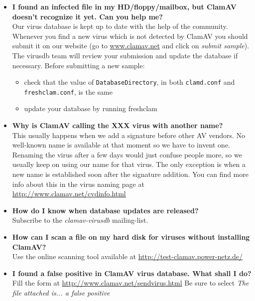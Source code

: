 \documentclass[a4paper,titlepage,12pt]{article}
\begin{document}
\begin{itemize}
	\item \textbf{I found an infected file in my HD/floppy/mailbox, but
	ClamAV doesn't recognize it yet. Can you help me?}\\
	Our virus database is kept up to date with the help of the community.
	Whenever you find a new virus which is not detected by ClamAV you
	should submit it on our website (go to \url{www.clamav.net} and
	click on \emph{submit sample}). The virusdb team will review your
	submission and update the database if necessary. Before submitting
	a new sample:
	\begin{itemize}
	    \item check that the value of \verb+DatabaseDirectory+, in both
	    \verb+clamd.conf+ and\\ \verb+freshclam.conf+, is the same
	    \item update your database by running freshclam
	\end{itemize}

	\item \textbf{Why is ClamAV calling the XXX virus with another name?}\\
	This usually happens when we add a signature before other AV
	vendors. No well-known name is available at that moment so we have to
	invent one. Renaming the virus after a few days would just confuse
	people more, so we usually keep on using our name for that virus. The
	only exception is when a new name is established soon after the
	signature addition. You can find more info about this in the virus
	naming page at \url{http://www.clamav.net/cvdinfo.html}

	\item \textbf{How do I know when database updates are released?}\\
	Subscribe to the \emph{clamav-virusdb} mailing-list.

	\item \textbf{How can I scan a file on my hard disk for viruses
	without installing ClamAV?}\\
	Use the online scanning tool available at
	\url{http://test-clamav.power-netz.de/}

	\item \textbf{I found a false positive in ClamAV virus database. What
	shall I do?}\\
	Fill the form at \url{http://www.clamav.net/sendvirus.html} Be sure to
	select \emph{The file attached is... a false positive}


\end{itemize}
\end{document}
